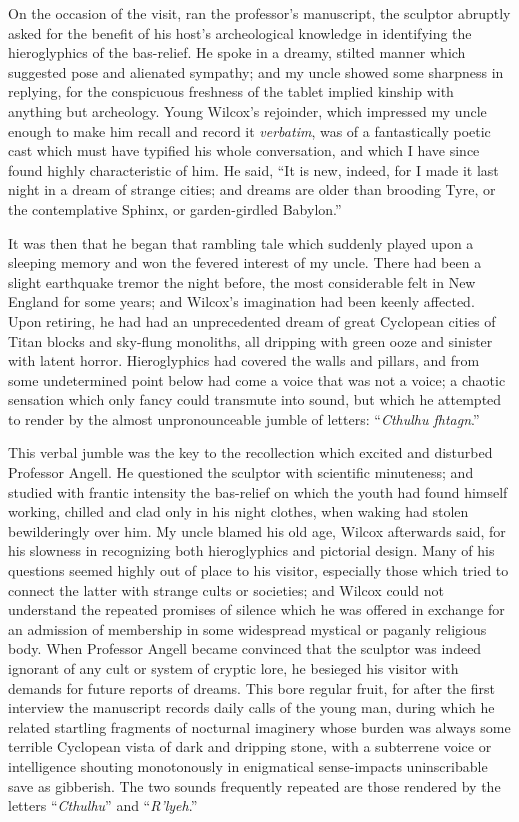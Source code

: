 \begin{pages}
\begin{Leftside}
On the occasion of the visit, ran the professor's manuscript, the
sculptor abruptly asked for the benefit of his host's archeological
knowledge in identifying the hieroglyphics of the bas-relief. He spoke
in a dreamy, stilted manner which suggested pose and alienated sympathy;
and my uncle showed some sharpness in replying, for the conspicuous
freshness of the tablet implied kinship with anything but archeology.
Young Wilcox's rejoinder, which impressed my uncle enough to make him
recall and record it \emph{verbatim}, was of a fantastically poetic cast which
must have typified his whole conversation, and which I have since found
highly characteristic of him. He said, ``It is new, indeed, for I made
it last night in a dream of strange cities; and dreams are older than
brooding Tyre, or the contemplative Sphinx, or garden-girdled Babylon.''

It was then that he began that rambling tale which suddenly played upon
a sleeping memory and won the fevered interest of my uncle. There had been a slight earthquake tremor the night before, the most considerable
felt in New England for some years; and Wilcox's imagination had been
keenly affected. Upon retiring, he had had an unprecedented dream of
great Cyclopean cities of Titan blocks and sky-flung monoliths, all
dripping with green ooze
and sinister with latent horror. Hieroglyphics
had covered the walls and pillars, and from some undetermined point
below had come a voice that was not a voice; a chaotic sensation which
only fancy could transmute into sound, but which he attempted to render
by the almost unpronounceable jumble of letters: ``\emph{Cthulhu fhtagn}.''

This verbal jumble was the key to the recollection which excited and
disturbed Professor Angell. He questioned the sculptor with scientific
minuteness; and studied with frantic intensity the bas-relief on which
the youth had found himself working, chilled and clad only in his night
clothes, when waking had stolen bewilderingly over him. My uncle blamed
his old age, Wilcox afterwards said, for his slowness in recognizing
both hieroglyphics and pictorial design. Many of his questions seemed
highly out of place to his visitor, especially those which tried to
connect the latter with strange cults or societies; and Wilcox could not
understand the repeated promises of silence which he was offered in
exchange for an admission of membership in some widespread mystical or
paganly religious body. When Professor Angell became convinced that the
sculptor was indeed ignorant of any cult or system of cryptic lore, he
besieged his visitor with demands for future reports of dreams. This
bore regular fruit, for after the first interview the manuscript records
daily calls of the young man, during which he related startling
fragments of nocturnal imaginery whose burden was always some terrible
Cyclopean vista of dark and dripping stone, with a subterrene voice or
intelligence shouting monotonously in enigmatical sense-impacts
uninscribable save as gibberish. The two sounds frequently repeated are
those rendered by the letters ``\emph{Cthulhu}'' and ``\emph{R'lyeh}.''


\end{Leftside}
\end{pages}
